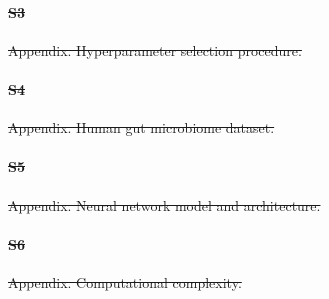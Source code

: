 \documentclass[10pt,letterpaper]{article}
\newcommand{\1}{{\rm 1}\kern-0.24em{\rm I}}
\providecommand{\DIFdeltex}[1]{{\protect\color{red}\sout{#1}}}                      %
\providecommand{\DIFdelbegin}{} %
\providecommand{\DIFdelend}{} %
\providecommand{\DIFdel}[1]{\texorpdfstring{\DIFdeltex{#1}}{}} %
\newcommand{\DIFscaledelfig}{0.5}
\newlength{\DIFdelgraphicswidth} %
\newlength{\DIFdelgraphicsheight} %
\newcommand{\DIFdelincludegraphics}[2][]{%
\sbox{\DIFdelgraphicsbox}{\DIFOincludegraphics[#1]{#2}}%
\settoboxwidth{\DIFdelgraphicswidth}{\DIFdelgraphicsbox} %
\settoboxtotalheight{\DIFdelgraphicsheight}{\DIFdelgraphicsbox} %
\scalebox{\DIFscaledelfig}{%
\parbox[b]{\DIFdelgraphicswidth}{\usebox{\DIFdelgraphicsbox}\\[-\baselineskip] \rule{\DIFdelgraphicswidth}{0em}}\llap{\resizebox{\DIFdelgraphicswidth}{\DIFdelgraphicsheight}{%
\setlength{\unitlength}{\DIFdelgraphicswidth}%
\begin{picture}(1,1)%
\thicklines\linethickness{2pt} %
{\color[rgb]{1,0,0}\put(0,0){\framebox(1,1){}}}%
{\color[rgb]{1,0,0}\put(0,0){\line( 1,1){1}}}%
{\color[rgb]{1,0,0}\put(0,1){\line(1,-1){1}}}%
\end{picture}%
}\hspace*{3pt}}} %
} %
\DeclareRobustCommand{\DIFdelbegin}{\DIFOdelbegin \let\includegraphics\DIFdelincludegraphics} %
\DeclareRobustCommand{\DIFdelend}{\DIFOaddend \let\includegraphics\DIFOincludegraphics} %
\begin{document}
\DIFdelbegin \paragraph*{\DIFdel{S3}}%
\DIFdel{\hspace{-2ex}
}%
\DIFdel{Appendix. Hyperparameter selection procedure.}%
\DIFdelend %

\DIFdelbegin \paragraph*{\DIFdel{S4}}%
\DIFdel{\hspace{-2ex}
}%
\DIFdel{Appendix. Human gut microbiome dataset.}%
\DIFdelend %

\DIFdelbegin \paragraph*{\DIFdel{S5}}%
\DIFdel{\hspace{-2ex}
}%
\DIFdel{Appendix. Neural network model and architecture.}%
\DIFdelend %

\DIFdelbegin \paragraph*{\DIFdel{S6}}%
\DIFdel{\hspace{-2ex}
}%
\DIFdel{Appendix. Computational complexity.}%
\DIFdelend %
\end{document}
